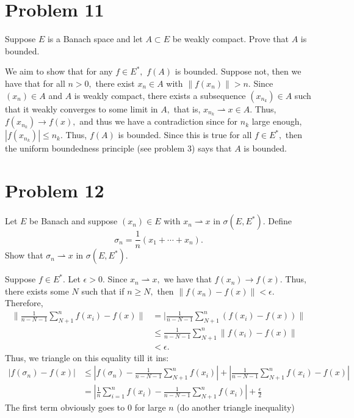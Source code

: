 \documentclass[11pt]{article}
\begin{document}
\section*{Problem 11}
\begin{problem}
    Suppose $E$ is a Banach space and let $A\subset E$ be weakly compact. Prove that $A$ is bounded.
\end{problem}
\begin{solution}
    We aim to show that for any $f\in E^*,$ $f(A)$ is bounded. Suppose not, then we have that for all $n>0,$ there exist $x_n \in A$ with $\|f(x_n)\| >n.$ Since $(x_n) \in A$ and $A$ is weakly compact, there exists a subsequence $(x_{n_k})\in A$ such that it weakly converges to some limit in $A,$ that is, $x_{n_k}\rightharpoonup x\in A.$ Thus, $f(x_{n_{k}})\to f(x),$ and thus we have a contradiction since for $n_k$ large enough, $|f(x_{n_k})|\leq n_k.$ Thus, $f(A)$ is bounded. Since this is true for all $f \in E^*,$ then the uniform boundedness principle (see problem 3) says that $A$ is bounded.
\end{solution}


\newpage
\section*{Problem 12}
\begin{problem}
    Let $E$ be Banach and suppose $(x_n)\in E$ with $x_n \rightharpoonup x$ in $\sigma(E, E^*).$ Define
    \[\sigma_n = \frac{1}{n}(x_1 + \cdots + x_n).\] Show that $\sigma_n \rightharpoonup x$ in $\sigma(E, E^*).$
\end{problem}
\begin{solution}
    Suppose $f \in E^*.$ Let $\epsilon>0.$ Since $x_n \rightharpoonup x,$ we have that $f(x_n)\to f(x).$ Thus, there exists some $N$ such that if $n\geq N,$ then $\|f(x_n) - f(x)\|< \epsilon.$ Therefore,
    \begin{align*}
        \|\frac{1}{n-N-1}\sum_{N+1}^n f(x_i) - f(x)\| &= |\frac{1}{n-N-1}\sum_{N+1}^n (f(x_i) - f(x))\|\\
        &\leq \frac{1}{n-N-1}\sum_{N+1}^n\|f(x_i) - f(x)\|\\
        &< \epsilon.
    \end{align*}
    Thus, we triangle on this equality till it ins:
    \begin{align*}
    |f(\sigma_n) - f(x)| &\leq |f(\sigma_n) - \frac{1}{n-N-1}\sum_{N+1}^nf(x_i)| + |\frac{1}{n-N-1}\sum_{N+1}^nf(x_i) - f(x)|\\
    &= |\frac{1}{n}\sum_{i=1}^n f(x_i) - \frac{1}{n-N-1}\sum_{N+1}^nf(x_i)| + \frac{\epsilon}{2}
    \end{align*}
    The first term obviously goes to $0$ for large $n$ (do another triangle inequality)
\end{solution}
\end{document}

